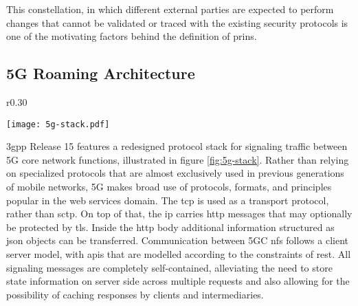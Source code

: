 This constellation, in which different external parties are expected to perform changes that cannot be validated or traced with the existing security protocols is one of the motivating factors behind the definition of \gls{prins}.

\subsection{5G Roaming Architecture}

\begin{wrapfigure}{r}{0.30\textwidth}
    \begin{center}
    \texttt{[image: 5g-stack.pdf]}
    \end{center}
    \caption{5G Control Plane Protocol Stack, according to TS 29.573 (\cite{3gpp.29.573}, 11)}
    \label{fig:5g-stack}
\end{wrapfigure}

\gls{3gpp} Release 15 features a redesigned protocol stack for signaling traffic between 5G core network functions, illustrated in figure \ref{fig:5g-stack}.
Rather than relying on specialized protocols that are almost exclusively used in previous generations of mobile networks, 5G makes broad use of protocols, formats, and principles popular in the web services domain.
The \gls{tcp} is used as a transport protocol, rather than \gls{sctp}.
On top of that, the \gls{ip} carries \gls{http} messages that may optionally be protected by \gls{tls}.
Inside the \gls{http} body additional information structured as \gls{json} objects can be transferred.
Communication between 5GC \glspl{nf} follows a client server model, with \glspl{api} that are modelled according to the constraints of \gls{rest}.
All signaling messages are completely self-contained, alleviating the need to store state information on server side across multiple requests and also allowing for the possibility of caching responses by clients and intermediaries.

\bigskip

